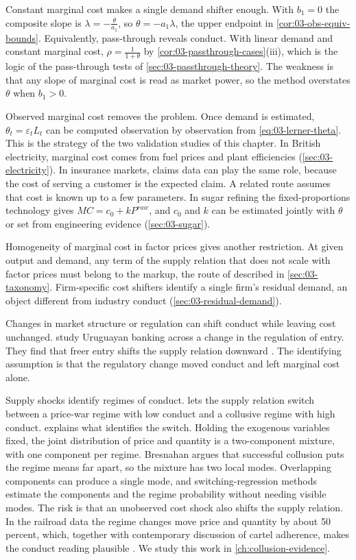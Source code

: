 Constant marginal cost makes a single demand shifter enough. With $b_1 = 0$ the composite slope is $\lambda =
-\frac{\theta}{a_1}$, so $\theta = -a_1\lambda$, the upper endpoint in \cref{cor:03-obs-equiv-bounds}. Equivalently,
pass-through reveals conduct. With linear demand and constant marginal cost, $\rho = \frac{1}{1 + \theta}$ by
\cref{cor:03-passthrough-cases}(iii), which is the logic of the pass-through tests of \cref{sec:03-passthrough-theory}.
The weakness is that any slope of marginal cost is read as market power, so the method overstates $\theta$ when
$b_1 > 0$.

Observed marginal cost removes the problem. Once demand is estimated, $\theta_t = \varepsilon_t L_t$ can be computed
observation by observation from \eqref{eq:03-lerner-theta}. This is the strategy of the two validation studies of this
chapter. In British electricity, marginal cost comes from fuel prices and plant efficiencies (\cref{sec:03-electricity}).
In insurance markets, claims data can play the same role, because the cost of serving a customer is the expected claim.
A related route assumes that cost is known up to a few parameters. In sugar refining the fixed-proportions technology
gives $MC = c_0 + kP^{raw}$, and $c_0$ and $k$ can be estimated jointly with $\theta$ or set from engineering evidence
(\cref{sec:03-sugar}).

Homogeneity of marginal cost in factor prices gives another restriction. At given output and demand, any term of the
supply relation that does not scale with factor prices must belong to the markup, the route of \citet{Appelbaum1982} described in
\cref{sec:03-taxonomy}. Firm-specific cost shifters identify a single firm's residual demand, an object different from
industry conduct (\cref{sec:03-residual-demand}).

Changes in market structure or regulation can shift conduct while leaving cost unchanged. \citet{SpillerFavaro1984} study
Uruguayan banking across a change in the regulation of entry. They find that freer entry shifts the supply relation
downward \citep[fn.~36]{Bresnahan1989}. The identifying assumption is that the regulatory change moved conduct and left
marginal cost alone.

Supply shocks identify regimes of conduct. \citet{Porter1983} lets the supply relation switch between a price-war regime
with low conduct and a collusive regime with high conduct. \citet[Section~3.4]{Bresnahan1989} explains what identifies the
switch. Holding the exogenous variables fixed, the joint distribution of price and quantity is a two-component mixture,
with one component per regime. Bresnahan argues that successful collusion puts the regime means far apart, so the mixture
has two local modes. Overlapping components can produce a single mode, and switching-regression methods estimate the
components and the regime probability without needing visible modes. The risk is that an unobserved cost shock also shifts the supply relation.
In the railroad data the regime changes move price and quantity by about 50 percent, which, together with contemporary
discussion of cartel adherence, makes the conduct reading plausible \citep[p.~1042]{Bresnahan1989}. We study this work in
\cref{ch:collusion-evidence}.

